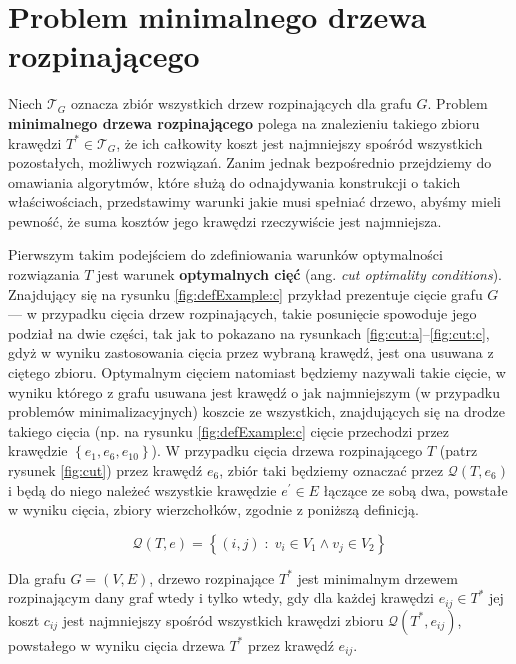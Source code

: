 \section{Problem minimalnego drzewa rozpinającego}\label{sec:mst}

Niech $\mathcal{T}_{G}$ oznacza zbiór wszystkich drzew rozpinających dla grafu $G$. Problem \textbf{minimalnego drzewa rozpinającego} polega na znalezieniu takiego zbioru krawędzi $T^{\ast} \in \mathcal{T}_{G}$, że ich całkowity koszt jest najmniejszy spośród wszystkich pozostałych, możliwych rozwiązań. Zanim jednak bezpośrednio przejdziemy do omawiania algorytmów, które służą do odnajdywania konstrukcji o takich właściwościach, przedstawimy warunki jakie musi spełniać drzewo, abyśmy mieli pewność, że suma kosztów jego krawędzi rzeczywiście jest najmniejsza.

Pierwszym takim podejściem do zdefiniowania warunków optymalności rozwiązania $T$ jest warunek \textbf{optymalnych cięć} (ang. \textit{cut optimality conditions}). Znajdujący się na rysunku \ref{fig:defExample:c} przykład prezentuje cięcie grafu $G$ --- w przypadku cięcia drzew rozpinających, takie posunięcie spowoduje jego podział na dwie części, tak jak to pokazano na rysunkach \ref{fig:cut:a}--\ref{fig:cut:c}, gdyż w wyniku zastosowania cięcia przez wybraną krawędź, jest ona usuwana z ciętego zbioru. Optymalnym cięciem natomiast będziemy nazywali takie cięcie, w wyniku którego z grafu usuwana jest krawędź o jak najmniejszym (w przypadku problemów minimalizacyjnych) koszcie ze wszystkich, znajdujących się na drodze takiego cięcia (np. na rysunku \ref{fig:defExample:c} cięcie przechodzi przez krawędzie $\left\{ e_{1}, e_{6}, e_{10} \right\}$). W przypadku cięcia drzewa rozpinającego $T$ (patrz rysunek \ref{fig:cut}) przez krawędź $e_{6}$, zbiór taki będziemy oznaczać przez $\mathcal{Q} \left( T, e_{6} \right)$ i będą do niego należeć wszystkie krawędzie $e^{\prime} \in E$ łączące ze sobą dwa, powstałe w wyniku cięcia, zbiory wierzchołków, zgodnie z poniższą definicją.

\begin{equation}\label{eq:treecutedgeset}
\mathcal{Q} \left( T, e \right) = \left\{ \left( i, j \right) \; : \; v_{i} \in V_{1} \wedge v_{j} \in V_{2} \right\}
\end{equation}

\begin{theorem}\label{def:optmstcut}
	Dla grafu $G = \left( V, E \right)$, drzewo rozpinające $T^{\ast}$ jest minimalnym drzewem rozpinającym dany graf wtedy i tylko wtedy, gdy dla każdej krawędzi $e_{ij} \in T^{\ast}$ jej koszt $c_{ij}$ jest najmniejszy spośród wszystkich krawędzi zbioru $\mathcal{Q} \left( T^{\ast}, e_{ij} \right)$, powstałego w wyniku cięcia drzewa $T^{\ast}$ przez krawędź $e_{ij}$.
\end{theorem}

